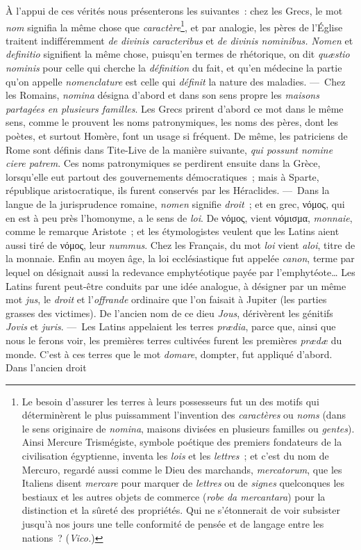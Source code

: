 \documentclass[french,twoside]{book} %
\begin{document}
À l’appui de ces vérités nous présenterons les suivantes : chez les Grecs, le mot {\itshape nom} signifia la même chose que {\itshape caractère}\footnote{Le besoin d’assurer les terres à leurs possesseurs fut un des motifs qui déterminèrent le plus puissamment l’invention des {\itshape caractères} ou {\itshape noms} (dans le sens originaire de {\itshape nomina}, maisons divisées en plusieurs familles ou {\itshape gentes}). Ainsi Mercure Trismégiste, symbole poétique des premiers fondateurs de la civilisation égyptienne, inventa les {\itshape lois} et les {\itshape lettres} ; et c’est du nom de Mercuro, regardé aussi comme le Dieu des marchands, {\itshape mercatorum}, que les Italiens disent {\itshape mercare} pour marquer de {\itshape lettres} ou de {\itshape signes} quelconques les bestiaux et les autres objets de commerce ({\itshape robe da mercantara}) pour la distinction et la sûreté des propriétés. Qui ne s’étonnerait de voir subsister jusqu’à nos jours une telle conformité de pensée et de langage entre les nations ? ({\itshape Vico.})}, et par analogie, les  pères de l’Église traitent indifféremment {\itshape de divinis caracteribus} et {\itshape de divinis nominibus. Nomen} et {\itshape definitio} signifient la même chose, puisqu’en termes de rhétorique, on dit {\itshape quæstio nominis} pour celle qui cherche la {\itshape définition} du fait, et qu’en médecine la partie qu’on appelle {\itshape nomenclature} est celle qui {\itshape définit} la nature des maladies. — Chez les Romains, {\itshape nomina} désigna d’abord et dans son sens propre les {\itshape maisons partagées en plusieurs familles}. Les Grecs prirent d’abord ce mot dans le même sens, comme le prouvent les noms patronymiques, les noms des pères, dont les poètes, et surtout Homère, font un usage si fréquent. De même, les patriciens de Rome sont définis dans Tite-Live de la manière suivante, \emph{{\itshape qui possunt nomine ciere patrem}}. Ces noms patronymiques se perdirent ensuite dans la Grèce, lorsqu’elle eut partout des gouvernements démocratiques ; mais à Sparte, république aristocratique, ils furent conservés par les Héraclides. — Dans la langue de la jurisprudence romaine, {\itshape nomen} signifie {\itshape droit} ; et en grec, νόμος, qui en est à peu près l’homonyme, a le sens de {\itshape loi}. De νόμος, vient νόμισμα, {\itshape monnaie}, comme le remarque Aristote ; et les étymologistes veulent que les Latins aient aussi  tiré de νόμος, leur {\itshape nummus}. Chez les Français, du mot {\itshape loi} vient {\itshape aloi}, titre de la monnaie. Enfin au moyen âge, la loi ecclésiastique fut appelée {\itshape canon}, terme par lequel on désignait aussi la redevance emphytéotique payée par l’emphytéote… Les Latins furent peut-être conduits par une idée analogue, à désigner par un même mot {\itshape jus}, le {\itshape droit} et l’{\itshape offrande} ordinaire que l’on faisait à Jupiter (les parties grasses des victimes). De l’ancien nom de ce dieu {\itshape Jous}, dérivèrent les génitifs {\itshape Jovis} et {\itshape juris}. — Les Latins appelaient les terres {\itshape prædia}, parce que, ainsi que nous le ferons voir, les premières terres cultivées furent les premières {\itshape prædæ} du monde. C’est à ces terres que le mot {\itshape domare}, dompter, fut appliqué d’abord. Dans l’ancien droit 
\end{document}
